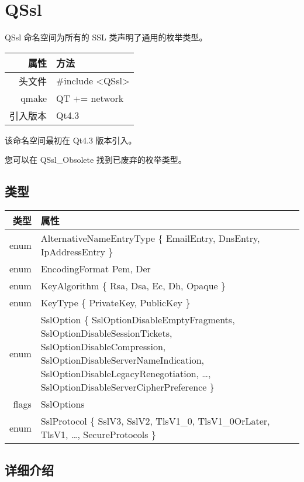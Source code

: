 \chapter{QSsl}

QSsl 命名空间为所有的 SSL 类声明了通用的枚举类型。

\begin{tabular}{|r|l|}
	\hline
	属性 & 方法 \\
	\hline
	头文件 & \#include <QSsl>\\      
	\hline
	qmake & QT += network\\      
	\hline
	引入版本 &	Qt4.3 \\ 
	\hline
\end{tabular}

该命名空间最初在 Qt4.3 版本引入。

\begin{compactitem}[\arr]
\item 您可以在 QSsl\_Obsolete 找到已废弃的枚举类型。
\end{compactitem}

\section{类型}


\begin{tabular}{|r|m{27em}|}
	\hline 
	类型 	&属性 \\ 
	\hline
enum &	AlternativeNameEntryType \{ EmailEntry, DnsEntry, IpAddressEntry \} \\ 
\hline
enum &	EncodingFormat { Pem, Der } \\ 
\hline
enum &	KeyAlgorithm \{ Rsa, Dsa, Ec, Dh, Opaque \} \\ 
\hline
enum &	KeyType \{ PrivateKey, PublicKey \} \\ 
\hline
enum &	SslOption \{ SslOptionDisableEmptyFragments, SslOptionDisableSessionTickets, SslOptionDisableCompression, SslOptionDisableServerNameIndication, SslOptionDisableLegacyRenegotiation, …, SslOptionDisableServerCipherPreference \} \\ 
\hline
flags &	SslOptions \\ 
\hline
enum &	SslProtocol \{ SslV3, SslV2, TlsV1\_0, TlsV1\_0OrLater, TlsV1, …, SecureProtocols \} \\ 
	\hline 
\end{tabular}



\section{详细介绍}


